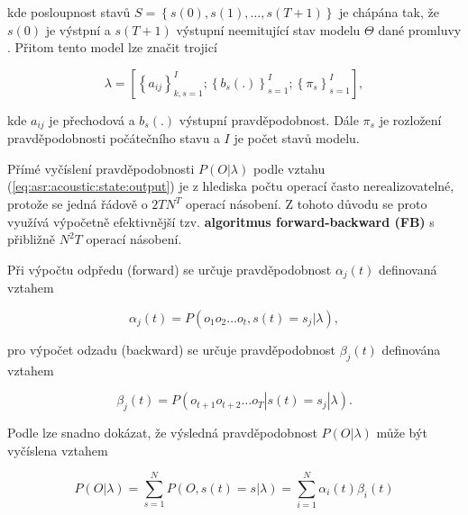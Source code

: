 \noindent kde posloupnost stavů $S = \left\{s\left(0\right), s\left(1\right),\dots, s\left(T+1\right)\right\}$ je chápána tak, že $s\left(0\right)$ je výstpní a $s\left(T+1\right)$ výstupní neemitující stav modelu $\Theta$ dané promluvy \cite{Psutka2006}. Přitom tento model lze značit trojicí

\begin{equation}
  \lambda = \left[\left\{a_{ij}\right\}_{k,s=1}^{I}; \left\{b_s(.)\right\}_{s=1}^{I};\left\{\pi_{s}\right\}_{s=1}^{I}\right],
  \label{eq:asr:acoustic:structure:marking}
\end{equation}

\noindent kde $a_{ij}$ je přechodová a $b_s(.)$ výstupní pravděpodobnost. Dále $\pi_s$ je rozložení pravděpodobnosti počátečního stavu a $I$ je počet stavů modelu.

Přímé vyčíslení pravděpodobnosti $P\left(O|\lambda\right)$ podle vztahu (\ref{eq:asr:acoustic:state:output}) je z hlediska počtu operací často nerealizovatelné, protože se jedná řádově o $2TN^{T}$ operací násobení. Z tohoto důvodu se proto využívá výpočetně efektivnější tzv. \textbf{algoritmus forward-backward (FB)} s přibližně $N^{2}T$ operací násobení.

Při výpočtu odpředu (forward) se určuje pravděpodobnost $\alpha_j\left(t\right)$ definovaná vztahem

\begin{equation}
  \alpha_{j}\left(t\right) = P\left(o_1o_2\dots o_t, s\left(t\right)=s_j|\lambda\right),
  \label{eq:asr:acoustic:structure:forward}
\end{equation}

\noindent pro výpočet odzadu (backward) se určuje pravděpodobnost $\beta_j\left(t\right)$ definována vztahem


\begin{equation}
  \beta_j\left(t\right) = P\left(o_{t+1}o_{t+2}\dots o_T|s\left(t\right)=s_j|\lambda\right).
  \label{eq:asr:acoustic:structure:backward}
\end{equation}

Podle \cite{Psutka2006} lze snadno dokázat, že výsledná pravděpodobnost $P\left(O|\lambda\right)$ může být vyčíslena vztahem

\begin{equation}
  P\left(O|\lambda\right) = \sum_{s=1}^{N} P\left(O, s\left(t\right) = s | \lambda\right) = \sum_{i = 1}^{N} \alpha_{i}\left(t\right)\beta_{i}\left(t\right)
  \label{eq:asr:acoustic:structure:forward-backward}
\end{equation}

